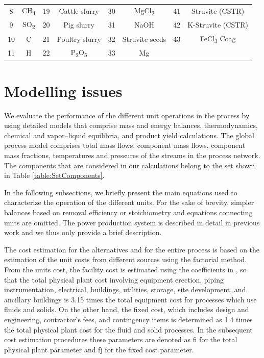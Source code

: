 \begin{refsection}[referencesCh2]
\begin{table}[]
{\begin{tabular}{@{}cccccccc@{}}
			8                    & CH\textsubscript{4}       & 19                   & Cattle slurry  & 30                   & MgCl\textsubscript{2}          & 41                   & Struvite (CSTR)  \\
			9                    & SO\textsubscript{2}       & 20                   & Pig slurry     & 31                   & NaOH           & 42                   & K-Struvite (CSTR) \\
			10                   & C         & 21                   & Poultry slurry & 32                   & Struvite seeds & 43                   & FeCl\textsubscript{3} Coag     \\
			11                   & H         & 22                   & P\textsubscript{2}O\textsubscript{5}          & 33                   & Mg             &                      &     \\          
		\bottomrule
		\end{tabular}
	}
\end{table}


\section{Modelling issues} \label{section:ModellingIssues}
We evaluate the performance of the different unit operations in the process by using detailed models that comprise mass and energy balances, thermodynamics, chemical and vapor–liquid equilibria, and product yield calculations. The global process model comprises total mass flows, component mass flows, component mass fractions, temperatures and pressures of the streams in the process network. The components that are considered in our calculations belong to the set shown in Table \ref{table:SetComponents}.

In the following subsections, we briefly present the main equations used to characterize the operation of the different units. For the sake of brevity, simpler balances based on removal efficiency or stoichiometry and equations connecting units are omitted. The power production system is described in detail in previous work \citep{Leon} and we thus only provide a brief description.

The cost estimation for the alternatives and for the entire process is based on the estimation of the unit costs from different sources using the factorial method. From the units cost, the facility cost is estimated using the coefficients in \citet{rk1999coulson}, so that the total physical plant cost involving equipment erection, piping instrumentation, electrical, buildings, utilities, storage, site development, and ancillary buildings is 3.15 times the total equipment cost for processes which use fluids and solids. On the other hand, the fixed cost, which includes design and engineering, contractor’s fees, and contingency items is determined as 1.4 times the total physical plant cost for the fluid and solid processes. In the subsequent cost estimation procedures these parameters are denoted as fi for the total physical plant parameter and fj for the fixed cost parameter.



\end{refsection}
